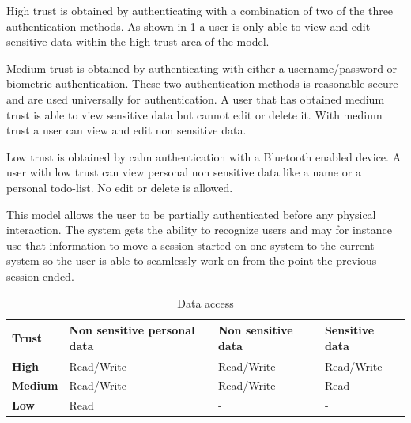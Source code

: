 High trust is obtained by authenticating with a combination of two of the three authentication methods.
As shown in \cref{table_data_access} a user is only able to view and edit sensitive data within the high trust area of the model.

Medium trust is obtained by authenticating with either a username/password or biometric authentication.
These two authentication methods is reasonable secure and are used universally for authentication.
A user that has obtained medium trust is able to view sensitive data but cannot edit or delete it.
With medium trust a user can view and edit non sensitive data.

Low trust is obtained by calm authentication with a Bluetooth enabled device.
A user with low trust can view personal non sensitive data like a name or a personal todo-list.
No edit or delete is allowed.

This model allows the user to be partially authenticated before any physical interaction.
The system gets the ability to recognize users and may for instance use that information to move a session started on one system to the current system so the user is able to seamlessly work on from the point the previous session ended.

\begin{table}[!t]
\caption{Data access}
\label{table_data_access}
\centering
\begin{tabular}{|p{1.3cm}|p{2.0cm}|p{2.0cm}|p{2.0cm}|}
\hline
\textbf{Trust} & \textbf{Non sensitive personal data} & \textbf{Non sensitive data} & \textbf{Sensitive data}\\
\hline
\textbf{High} & Read/Write & Read/Write & Read/Write\\
\hline
\textbf{Medium} & Read/Write & Read/Write & Read\\
\hline
\textbf{Low} & Read & - & -\\
\hline
\end{tabular}
\end{table}

